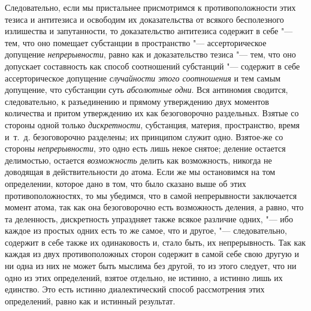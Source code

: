 Следовательно, если мы пристальнее присмотримся к противоположности этих
тезиса и антитезиса и освободим их доказательства от всякого бесполезного
излишества и запутанности, то доказательство антитезиса содержит в себе
"--- тем, что оно помещает субстанции в пространство "--- ассерторическое
допущение {\em непрерывности}, равно как и
доказательство тезиса "--- тем, что оно допускает составность как способ
соотношений субстанций "--- содержит в себе ассерторическое допущение
{\em случайности этого соотношения} и тем самым
допущение, что субстанции суть {\em абсолютные одни}.
Вся антиномия сводится, следовательно, к разъединению и прямому утверждению
двух моментов количества и притом утверждению их как безоговорочно
раздельных. Взятые со стороны одной только
{\em дискретности}, субстанция, материя, пространство,
время и~т.~д. безоговорочно разделены; их принципом служит одно. Взятое-же
со стороны {\em непрерывности}, это одно есть лишь
некое снятое; деление остается делимостью, остается
{\em возможность} делить как возможность, никогда не
доводящая в действительности до атома. Если же мы остановимся на том
определении, которое дано в том, что было сказано выше об этих
противоположностях, то мы убедимся, что в самой непрерывности заключается
момент атома, так как она безоговорочно есть возможность деления, а равно,
что та деленность, дискретность упраздняет также всякое различие одних, "---
ибо каждое из простых одних есть то же самое, что и другое, "---
следовательно, содержит в себе также их одинаковость и, стало быть, их
непрерывность. Так как каждая из двух противоположных сторон содержит в
самой себе свою другую и ни одна из них не может быть мыслима без другой,
то из этого следует, что ни одно из этих определений, взятое отдельно, не
истинно, а истинно лишь их единство. Это есть истинно диалектический способ
рассмотрения этих определений, равно как и истинный результат.

